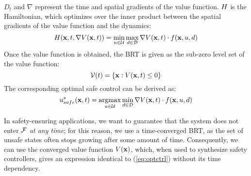 % 
$D_t$ and $\nabla$ represent the time and spatial gradients of the value function. $H$ is the Hamiltonian, which optimizes over the inner product between the spatial gradients of the value function and the dynamics:
% 
\begin{equation}\label{eq:HJIVI_ham_live}
    H(\mathbf{x}, t, \nabla V(\mathbf{x}, t)) = \min_{u \in \mathcal{U}} \max_{d \in \mathcal{D}} \nabla V(\mathbf{x}, t) \cdot f(\mathbf{x}, u, d)
\end{equation}
% 
Once the value function is obtained, the BRT is given as the sub-zero level set of the value function:
% 
\begin{equation}
\mathcal{V}(t)=\{\mathbf{x}: V(\mathbf{x}, t) \leq 0\}
\end{equation}
% 
The corresponding optimal safe control can be derived as:
% 
\begin{equation}\label{eq:optctrl}
\ctrl^{*}_{safe}(\state, \tvar)=\argmax_{\ctrl \in \cset} \min_{\dstb \in \dset}\nabla \vfunc(\state, \tvar) \cdot \dyn(\state, \ctrl, \dstb)
\end{equation}
% 


In safety-ensuring applications, we want to guarantee that the system does not enter $\mathcal{F}$ \textit{at any time}; for this reason, we use a time-converged BRT, as the set of unsafe states often stops growing after some amount of time. Consequently, we can use the converged value function $V(\mathbf{x})$, which, when used to synthesize safety controllers, gives an expression identical to (\ref{eq:optctrl}) without its time dependency.

